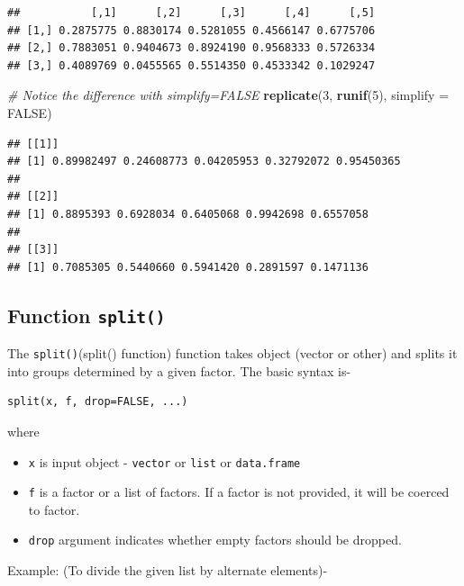 \documentclass[
]{book}
\newenvironment{Shaded}{\begin{snugshade}}{\end{snugshade}}
\newcommand{\AttributeTok}[1]{\textcolor[rgb]{0.13,0.29,0.53}{#1}}
\newcommand{\CommentTok}[1]{\textcolor[rgb]{0.56,0.35,0.01}{\textit{#1}}}
\newcommand{\ConstantTok}[1]{\textcolor[rgb]{0.56,0.35,0.01}{#1}}
\newcommand{\DecValTok}[1]{\textcolor[rgb]{0.00,0.00,0.81}{#1}}
\newcommand{\FunctionTok}[1]{\textcolor[rgb]{0.13,0.29,0.53}{\textbf{#1}}}
\newcommand{\NormalTok}[1]{#1}
\providecommand{\tightlist}{%
  \setlength{\itemsep}{0pt}\setlength{\parskip}{0pt}}
\begin{document}
\begin{verbatim}
##           [,1]      [,2]      [,3]      [,4]      [,5]
## [1,] 0.2875775 0.8830174 0.5281055 0.4566147 0.6775706
## [2,] 0.7883051 0.9404673 0.8924190 0.9568333 0.5726334
## [3,] 0.4089769 0.0455565 0.5514350 0.4533342 0.1029247
\end{verbatim}

\begin{Shaded}
\begin{Highlighting}[]
\CommentTok{\# Notice the difference with simplify=FALSE}
\FunctionTok{replicate}\NormalTok{(}\DecValTok{3}\NormalTok{, }\FunctionTok{runif}\NormalTok{(}\DecValTok{5}\NormalTok{), }\AttributeTok{simplify =} \ConstantTok{FALSE}\NormalTok{)}
\end{Highlighting}
\end{Shaded}

\begin{verbatim}
## [[1]]
## [1] 0.89982497 0.24608773 0.04205953 0.32792072 0.95450365
## 
## [[2]]
## [1] 0.8895393 0.6928034 0.6405068 0.9942698 0.6557058
## 
## [[3]]
## [1] 0.7085305 0.5440660 0.5941420 0.2891597 0.1471136
\end{verbatim}

\hypertarget{function-split}{%
\subsection{\texorpdfstring{Function \texttt{split()}}{Function split()}}\label{function-split}}

The \texttt{split()}\index(split() function) function takes object (vector or other) and splits it into groups determined by a given factor. The basic syntax is-

\begin{verbatim}
split(x, f, drop=FALSE, ...)
\end{verbatim}

where

\begin{itemize}
\tightlist
\item
  \texttt{x} is input object - \texttt{vector} or \texttt{list} or \texttt{data.frame}
\item
  \texttt{f} is a factor or a list of factors. If a factor is not provided, it will be coerced to factor.
\item
  \texttt{drop} argument indicates whether empty factors should be dropped.
\end{itemize}

Example: (To divide the given list by alternate elements)-
\end{document}
